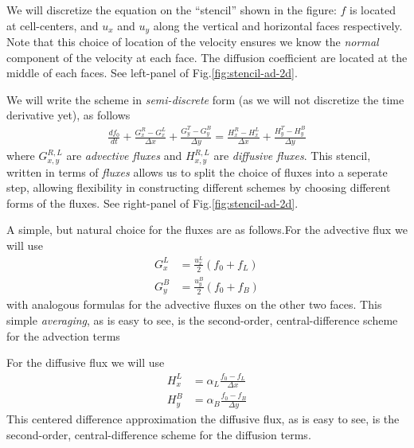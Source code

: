 \documentclass[12pt]{article}
\theoremstyle{definition}
\theoremstyle{definition}
\theoremstyle{definition}
\begin{document}
We will discretize the equation on the ``stencil'' shown in the
figure: $f$ is located at cell-centers, and $u_x$ and $u_y$ along the
vertical and horizontal faces respectively. Note that this choice of
location of the velocity ensures we know the \emph{normal} component
of the velocity at each face. The diffusion coefficient are located at
the middle of each faces. See left-panel of
Fig.\thinspace\ref{fig:stencil-ad-2d}.

We will write the scheme in \emph{semi-discrete} form (as we will not
discretize the time derivative yet), as follows
\begin{align}
  \frac{df_0}{dt}
  +
  \frac{G_x^R -G_x^L}{\Delta x}
  +
  \frac{G_y^T -G_y^B}{\Delta y}
  =
  \frac{H_x^R - H_x^L}{\Delta x}
  +
  \frac{H_y^T - H_y^B}{\Delta y}
\end{align}
where $G^{R,L}_{x,y}$ are \emph{advective fluxes} and $H^{R,L}_{x,y}$
are \emph{diffusive fluxes}. This stencil, written in terms of
\emph{fluxes} allows us to split the choice of fluxes into a seperate
step, allowing flexibility in constructing different schemes by
choosing different forms of the fluxes. See right-panel of
Fig.\thinspace\ref{fig:stencil-ad-2d}.

A simple, but natural choice for the fluxes are as follows.For the
advective flux we will use
\begin{align}
  G_x^L &= \frac{u_x^L}{2} (f_0 + f_L) \\
  G_y^B &= \frac{u_y^B}{2} (f_0 + f_B)
\end{align}
with analogous formulas for the advective fluxes on the other two
faces.  This simple \emph{averaging}, as is easy to see, is the
second-order, central-difference scheme for the advection terms

For the diffusive flux we will use
\begin{align}
  H_x^L &= \alpha_L\frac{f_0 - f_L}{\Delta x} \\
  H_y^B &= \alpha_B \frac{f_0 - f_B}{\Delta y}
\end{align}
This centered difference approximation the diffusive flux, as is easy
to see, is the second-order, central-difference scheme for the
diffusion terms.
\end{document}
